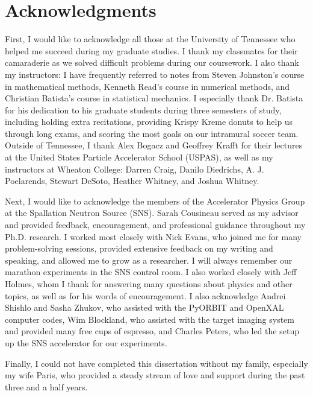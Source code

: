 \chapter*{Acknowledgments} 

First, I would like to acknowledge all those at the University of Tennessee who helped me succeed during my graduate studies. I thank my classmates for their camaraderie as we solved difficult problems during our coursework. I also thank my instructors: I have frequently referred to notes from Steven Johnston’s course in mathematical methods, Kenneth Read’s course in numerical methods, and Christian Batista’s course in statistical mechanics. I especially thank Dr. Batista for his dedication to his graduate students during three semesters of study, including holding extra recitations, providing Krispy Kreme donuts to help us through long exams, and scoring the most goals on our intramural soccer team. Outside of Tennessee, I thank Alex Bogacz and Geoffrey Krafft for their lectures at the United States Particle Accelerator School (USPAS), as well as my instructors at Wheaton College: Darren Craig, Danilo Diedrichs, A. J. Poelarends, Stewart DeSoto, Heather Whitney, and Joshua Whitney. 

Next, I would like to acknowledge the members of the Accelerator Physics Group at the Spallation Neutron Source (SNS). Sarah Cousineau served as my advisor and provided feedback, encouragement, and professional guidance throughout my Ph.D. research. I worked most closely with Nick Evans, who joined me for many problem-solving sessions, provided extensive feedback on my writing and speaking, and allowed me to grow as a researcher. I will always remember our marathon experiments in the SNS control room. I also worked closely with Jeff Holmes, whom I thank for answering many questions about physics and other topics, as well as for his words of encouragement. I also acknowledge Andrei Shishlo and Sasha Zhukov, who assisted with the PyORBIT and OpenXAL computer codes, Wim Blockland, who assisted with the target imaging system and provided many free cups of espresso, and Charles Peters, who led the setup up the SNS accelerator for our experiments.

Finally, I could not have completed this dissertation without my family, especially my wife Paris, who provided a steady stream of love and support during the past three and a half years.